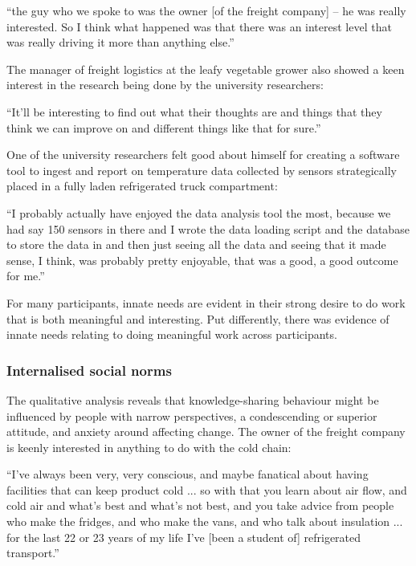 \begin{displayquote}[Participant 16/1]
\small
\enquote{the guy who we spoke to was the owner [of the freight company] -- he was really interested. So I think what happened was that there was an interest level that was really driving it more than anything else.} 
\end{displayquote}
 

The manager of freight logistics at the leafy vegetable grower also showed a keen interest in the research being done by the university researchers:

\begin{displayquote}[Participant 3/1]
\small
\enquote{It'll be interesting to find out what their thoughts are and things that they think we can improve on and different things like that for sure.} 
\end{displayquote}
 

One of the university researchers felt good about himself for creating a software tool to ingest and report on temperature data collected by sensors strategically placed in a fully laden refrigerated truck compartment:

\begin{displayquote}[Participant 3/1]
\small
\enquote{I probably actually have enjoyed the data analysis tool the most, because we had say 150 sensors in there and I wrote the data loading script and the database to store the data in and then just seeing all the data and seeing that it made sense, I think, was probably pretty enjoyable, that was a good, a good outcome for me.} 
\end{displayquote}
 

For many participants, innate needs are evident in their strong desire to do work that is both meaningful and interesting. Put differently, there was evidence of innate needs relating to doing meaningful work across participants. 

\subsubsection{Internalised social norms}

The qualitative analysis reveals that knowledge-sharing behaviour might be influenced by people with narrow perspectives, a condescending or superior attitude, and anxiety around affecting change. The owner of the freight company is keenly interested in anything to do with the cold chain:

\begin{displayquote}[Participant 8/1]
\small
\enquote{I've always been very, very conscious, and maybe fanatical about having facilities that can keep product cold ... so with that you learn about air flow, and cold air and what's best and what’s not best, and you take advice from people who make the fridges, and who make the vans, and who talk about insulation ... for the last 22 or 23 years of my life I've [been a student of] refrigerated transport.} 
\end{displayquote}
 

